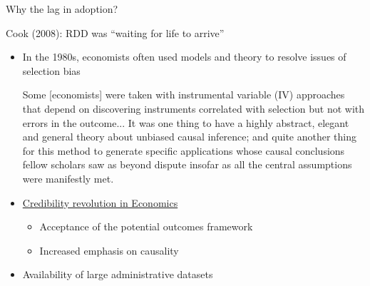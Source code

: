 \documentclass[compress, 8pt]{beamer}
\begin{document}
\begin{frame}{Why the lag in adoption?}

Cook (2008): RDD was ``waiting for life to arrive''
\begin{itemize}
    \vspace{2ex}
    \item In the 1980s, economists often used models and theory to resolve issues of selection bias 
    \begin{displayquote}
    Some [economists] were taken with instrumental variable (IV) approaches that depend on discovering instruments correlated with selection but not with errors in the outcome... It was one thing to have a highly abstract, elegant and general theory about unbiased causal inference; and quite another thing for this method to generate specific applications whose causal conclusions fellow scholars saw as beyond dispute insofar as all the central assumptions were manifestly met.
    \end{displayquote}

    \vspace{3ex}
    \item \href{https://en.wikipedia.org/wiki/Credibility_revolution}{Credibility revolution in Economics}
    \begin{itemize}
        \item Acceptance of the potential outcomes framework
        \item Increased emphasis on causality
    \end{itemize}

    \vspace{3ex}
    \item Availability of large administrative datasets

\end{itemize}

\end{frame}
\end{document}
